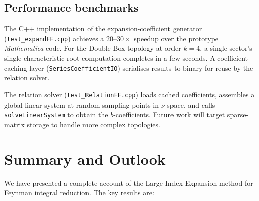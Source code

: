\documentclass[12pt]{article}
\begin{document}
\subsection{Performance benchmarks}

The C++ implementation of the expansion-coefficient generator
(\texttt{test\_expandFF.cpp}) achieves a $20$--$30\times$ speedup over the
prototype \emph{Mathematica} code.  For the Double Box topology at order $k=4$,
a single sector's single characteristic-root computation completes in a few
seconds.  A coefficient-caching layer (\texttt{SeriesCoefficientIO}) serialises
results to binary for reuse by the relation solver.

The relation solver (\texttt{test\_RelationFF.cpp}) loads cached coefficients,
assembles a global linear system at random sampling points in $\nu$-space,
and calls \texttt{solveLinearSystem} to obtain the $b$-coefficients.
Future work will target sparse-matrix storage to handle more complex topologies.

\section{Summary and Outlook}\label{sec:summary}

We have presented a complete account of the Large Index Expansion method for
Feynman integral reduction.  The key results are:
\end{document}
